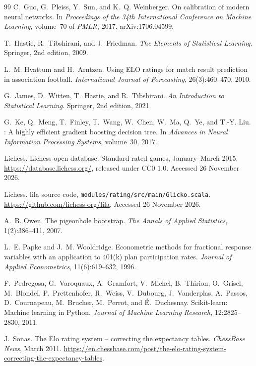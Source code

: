 \documentclass{article}
\begin{document}
\begin{thebibliography}{99}
C.~Guo, G.~Pleiss, Y.~Sun, and K.~Q. Weinberger.
\newblock On calibration of modern neural networks.
\newblock In \emph{Proceedings of the 34th International Conference on Machine Learning}, volume~70 of \emph{PMLR}, 2017. arXiv:1706.04599.

T.~Hastie, R.~Tibshirani, and J.~Friedman.
\newblock \emph{The Elements of Statistical Learning}.
\newblock Springer, 2nd edition, 2009.

L.~M. Hvattum and H.~Arntzen.
\newblock Using {ELO} ratings for match result prediction in association football.
\newblock \emph{International Journal of Forecasting}, 26(3):460--470, 2010.

G.~James, D.~Witten, T.~Hastie, and R.~Tibshirani.
\newblock \emph{An Introduction to Statistical Learning}.
\newblock Springer, 2nd edition, 2021.

G.~Ke, Q.~Meng, T.~Finley, T.~Wang, W.~Chen, W.~Ma, Q.~Ye, and T.-Y. Liu.
: A highly efficient gradient boosting decision tree.
\newblock In \emph{Advances in Neural Information Processing Systems}, volume~30, 2017.

Lichess.
\newblock Lichess open database: Standard rated games, January--March 2015.
\newblock \url{https://database.lichess.org/}, released under CC0 1.0. Accessed 26 November 2026.

Lichess.
\newblock lila source code, \texttt{modules/rating/src/main/Glicko.scala}.
\newblock \url{https://github.com/lichess-org/lila}. Accessed 26 November 2026.

A.~B. Owen.
\newblock The pigeonhole bootstrap.
\newblock \emph{The Annals of Applied Statistics}, 1(2):386--411, 2007.

L.~E. Papke and J.~M. Wooldridge.
\newblock Econometric methods for fractional response variables with an application to 401(k) plan participation rates.
\newblock \emph{Journal of Applied Econometrics}, 11(6):619--632, 1996.

F.~Pedregosa, G.~Varoquaux, A.~Gramfort, V.~Michel, B.~Thirion, O.~Grisel, M.~Blondel, P.~Prettenhofer, R.~Weiss, V.~Dubourg, J.~Vanderplas, A.~Passos, D.~Cournapeau, M.~Brucher, M.~Perrot, and \'E.~Duchesnay.
\newblock Scikit-learn: Machine learning in {Python}.
\newblock \emph{Journal of Machine Learning Research}, 12:2825--2830, 2011.

J.~Sonas.
\newblock The Elo rating system -- correcting the expectancy tables.
\newblock \emph{ChessBase News}, March 2011.
\newblock \url{https://en.chessbase.com/post/the-elo-rating-system-correcting-the-expectancy-tables}.

\end{thebibliography}
\end{document}
